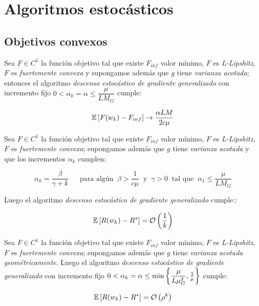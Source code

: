 \section{Algoritmos estoc\'asticos}

\subsection{Objetivos convexos}

\begin{theorem}
	Sea $F \in C^1$ la funci\'on objetivo tal que existe $F_{inf}$ valor m\'inimo, $F$ es \textit{L-Lipshitz}, $F$ es \textit{fuertemente convexa} y supongamos adem\'as que $g$ tiene \textit{varianza acotada}; entonces el algoritmo \textit{descenso estoc\'astico de gradiente generalizado} con incremento fijo $0  <  \alpha_k = \alpha \leq \dfrac{\mu}{LM_G}$ cumple:

	\begin{equation*}
	\mathbb{E} \left[F(w_k) - F_{inf}\right] \rightarrow \dfrac{\alpha LM}{2 c \mu}
	\end{equation*}
	
\end{theorem}

\begin{theorem}
	Sea $F \in C^1$ la funci\'on objetivo tal que existe $F_{inf}$ valor m\'inimo, $F$ es \textit{L-Lipshitz}, $F$ es \textit{fuertemente convexa}; supongamos adem\'as que $g$ tiene \textit{varianza acotada} y que los incrementos $\alpha_k$ cumplen:
	
	\begin{equation}
	\alpha_k =  \dfrac{\beta}{\gamma + k} \quad \ \text{ para alg\'un } \ \beta > \frac{1}{c \mu} \  \text{ y } \ \gamma > 0 \  \text{ tal que } \ \alpha_1 \leq \dfrac{\mu}{L M_G} 
	\end{equation}
	
	Luego el algoritmo \textit{descenso estoc\'astico de gradiente generalizado} cumple::
	
	\begin{equation*}
		\mathbb{E} \left[R(w_k) - R^*\right] = \mathcal{O} \left(\frac{1}{k}\right)
	\end{equation*}
	
\end{theorem}

\begin{theorem}
	Sea $F \in C^1$ la funci\'on objetivo tal que existe $F_{inf}$ valor m\'inimo, $F$ es \textit{L-Lipshitz}, $F$ es \textit{fuertemente convexa}; supongamos adem\'as que $g$ tiene \textit{varianza acotada geom\'etricamente}. Luego el algoritmo \textit{descenso estoc\'astico de gradiente generalizado} con incremento fijo $0  < \alpha_k = \alpha \leq \min\left\lbrace\dfrac{\mu}{L \mu_G^2}, \frac{1}{ \mu}\right\rbrace $ cumple:
	
	\begin{equation*}
	\mathbb{E} \left[R(w_k) - R^*\right] = \mathcal{O} \left(\rho^{k}\right)
	\end{equation*}
	
\end{theorem}

